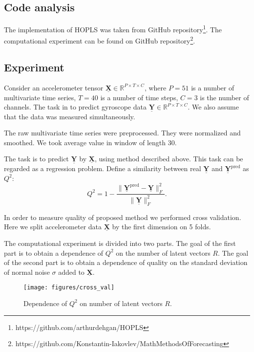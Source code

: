 \documentclass[../../main.tex]{subfiles}
\begin{document}
\subsection{Code analysis}

The implementation of HOPLS was taken from GitHub repository\footnote{https://github.com/arthurdehgan/HOPLS}. The computational experiment can be found on GitHub repository\footnote{https://github.com/Konstantin-Iakovlev/MathMethodsOfForecasting}.

\subsection{Experiment}

Consider an accelerometer tensor $\underline{\mathbf{X}}\in \mathbb{R}^{P\times T \times C}$, where $P = 51$ is a number of multivariate time series, $T = 40$ is a number of time steps, $C = 3$ is the number of channels. The task in to predict gyroscope data $\underline{\mathbf{Y}} \in \mathbb{R}^{P\times T \times C}$. We also assume that the data was measured simultaneously. 

The raw multivariate time series were preprocessed. They were normalized and smoothed. We took average value in window of length 30.

The task is to predict $\underline{\mathbf{Y}}$ by $\underline{\mathbf{X}}$, using method described above. This task can be regarded as a regression problem. Define a similarity between real $\underline{\mathbf{Y}}$ and $\underline{\mathbf{Y}}^\text{pred}$ as $Q^2$:
\begin{equation}
Q^2 = 1 - \frac{\|\underline{\mathbf{Y}}^\text{pred} - \underline{\mathbf{Y}}\|_F^2}{\|\underline{\mathbf{Y}}\|_F^2}.
\end{equation}

In order to measure quality of proposed method we performed cross validation. Here we split accelerometer data $\underline{\mathbf{X}}$ by the first dimension on 5 folds.

The computational experiment is  divided into two parts. The goal of the first part is to obtain a dependence of $Q^2$ on the number of latent vectors $R$. The goal of the second part is to obtain a dependence of quality on the standard deviation of normal noise $\sigma$ added to $\underline{\mathbf{X}}$. 

\begin{figure}[h!]
\centering
\texttt{[image: figures/cross\_val]}
\caption{Dependence of $Q^2$ on number of latent vectors $R$.}
\label{fig:exp_1}
\end{figure}
\end{document}
